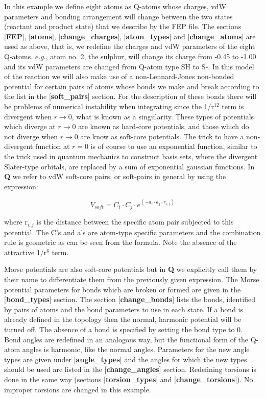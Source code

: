 \documentclass[a4paper,10pt]{article}
\begin{document}
In this  example we define eight  atoms as Q-atoms whose  charges, vdW
parameters and bonding arrangement will  change between the two states
(reactant and  product state) that  we describe  by the FEP  file. The
sections               [\textbf{FEP}],               [\textbf{atoms}],
[\textbf{change{\_}charges}],       [\textbf{atom{\_}types}]       and
[\textbf{change{\_}atoms}] are used as above, that is, we redefine the
charges and vdW  parameters of the eight Q-atoms. $e.g.$,  atom no. 2,
the sulphur,  will change its charge  from -0.45 to -1.00  and its vdW
parameters are changed from Q-atom type SH to S-. In this model of the
reaction  we will  also  make use  of  a non-Lennard-Jones  non-bonded
potential for  certain pairs of  atoms whose  bonds we make  and break
according to the list in the [\textbf{soft{\_}pairs}] section. For the
description  of  these  bonds  there will  be  problems  of  numerical
instability when  integrating since  the 1/r$^{12}$ term  is divergent
when  $r \to  0$, what  is  known as  a singularity.   These types  of
potentials  which  diverge  at  $r  \to  0$  are  known  as  hard-core
potentials, and those which do not diverge  when $r \to 0$ are know as
soft-core potentials. The trick to have a non-divergent function at $r
= 0$ is of course to use an exponential function, similar to the trick
used in quantum mechanics to construct basis sets, where the divergent
Slater-type orbitals,  are replaced by  a sum of  exponential gaussian
functions.   In  \textbf{Q}  we  refer  to  vdW  soft-core  pairs,  or
soft-pairs in general by using the expression:

\[
V_{soft} = C_{i}\cdot C_{j}\cdot e^{(-a_{i}\cdot a_{j}\cdot
r_{i,j})}
\]

where  r$_{i,j}$  is  the  distance between  the  specific  atom  pair
subjected to  this potential. The  C's and a's are  atom-type specific
parameters and the  combination rule is geometric as can  be seen from
the formula. Note the absence of the attractive 1/r$^{6}$ term.

Morse potentials  are also soft-core  potentials but in  \textbf{Q} we
explicitly  call them  by their  name to  differentiate them  from the
previously given expression. The  Morse potential parameters for bonds
which are broken  or formed are given  in the [\textbf{bond{\_}types}]
section.   The  section  [\textbf{change{\_}bonds}] lists  the  bonds,
identified by  pairs of atoms and  the bond parameters to  use in each
state.  If a bond is already  defined in the topology then the normal,
harmonic  potential will  be turned  off.  The  absence of  a bond  is
specified by setting the bond type  to 0. Bond angles are redefined in
an analogous  way, but  the functional  form of  the Q-atom  angles is
harmonic, like the normal angles.   Parameters for the new angle types
are given under [\textbf{angle{\_}types}] and the angles for which the
new types should be used are listed in the [\textbf{change{\_}angles}]
section.   Redefining  torsions is  done  in  the same  way  (sections
[\textbf{torsion{\_}types}]  and  [\textbf{change{\_}torsions}]).   No
improper torsions are changed in this example.
\end{document}
